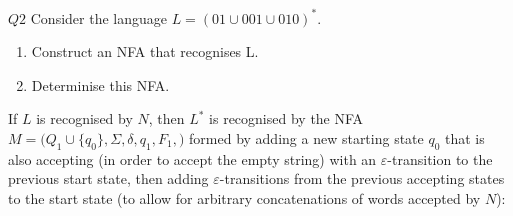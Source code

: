 \documentclass{article}
\theoremstyle{definition}
\theoremstyle{definition}
\theoremstyle{remark}
\begin{document}
\begin{questionbox}{$Q2$}
    Consider the language $L=(01\cup001\cup010)^\ast$.
    \begin{enumerate}
        \item[$(i)$] Construct an NFA that recognises L.
        
        \item[$(ii)$] Determinise this NFA.
    \end{enumerate}
\end{questionbox}

\bigskip





If $L$ is recognised by $N$, then $L^\ast$ is recognised by the NFA $M=\bigl(Q_1\cup\{q_0\},\Sigma,\delta,q_1,F_1,\bigr)$ formed by adding a new starting state $q_0$ that is also accepting (in order to accept the empty string) with an $\varepsilon$-transition to the previous start state, then adding $\varepsilon$-transitions from the previous accepting states to the start state (to allow for arbitrary concatenations of words accepted by $N$):
\end{document}
